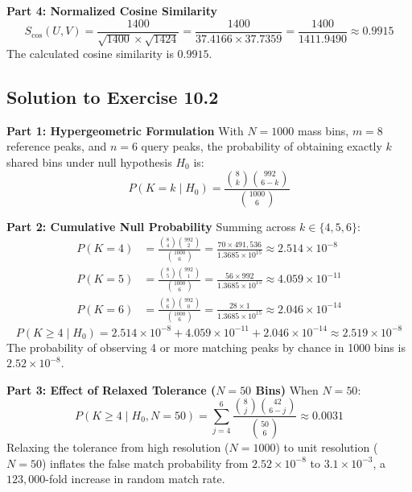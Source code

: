 \documentclass[11pt,twoside,openright]{book}
\begin{document}
\noindent\textbf{Part 4: Normalized Cosine Similarity}\enspace
\begin{equation*}
S_{\cos}(U, V) = \frac{1400}{\sqrt{1400} \times \sqrt{1424}} = \frac{1400}{37.4166 \times 37.7359} = \frac{1400}{1411.9490} \approx 0.9915
\end{equation*}
The calculated cosine similarity is $0.9915$.

\subsection{Solution to Exercise 10.2}

\noindent\textbf{Part 1: Hypergeometric Formulation}\enspace
With $N = 1000$ mass bins, $m = 8$ reference peaks, and $n = 6$ query peaks, the probability of obtaining exactly $k$ shared bins under null hypothesis $H_0$ is:
\begin{equation*}
P(K = k \mid H_0) = \frac{\binom{8}{k} \binom{992}{6 - k}}{\binom{1000}{6}}
\end{equation*}

\noindent\textbf{Part 2: Cumulative Null Probability}\enspace
Summing across $k \in \{4, 5, 6\}$:
\begin{align*}
P(K = 4) &= \frac{\binom{8}{4} \binom{992}{2}}{\binom{1000}{6}} = \frac{70 \times 491,536}{1.3685 \times 10^{15}} \approx 2.514 \times 10^{-8} \\
P(K = 5) &= \frac{\binom{8}{5} \binom{992}{1}}{\binom{1000}{6}} = \frac{56 \times 992}{1.3685 \times 10^{15}} \approx 4.059 \times 10^{-11} \\
P(K = 6) &= \frac{\binom{8}{6} \binom{992}{0}}{\binom{1000}{6}} = \frac{28 \times 1}{1.3685 \times 10^{15}} \approx 2.046 \times 10^{-14}
\end{align*}
\begin{equation*}
P(K \ge 4 \mid H_0) = 2.514 \times 10^{-8} + 4.059 \times 10^{-11} + 2.046 \times 10^{-14} \approx 2.519 \times 10^{-8}
\end{equation*}
The probability of observing 4 or more matching peaks by chance in 1000 bins is $2.52 \times 10^{-8}$.

\noindent\textbf{Part 3: Effect of Relaxed Tolerance ($N = 50$ Bins)}\enspace
When $N = 50$:
\begin{equation*}
P(K \ge 4 \mid H_0, N = 50) = \sum_{j=4}^6 \frac{\binom{8}{j} \binom{42}{6 - j}}{\binom{50}{6}} \approx 0.0031
\end{equation*}
Relaxing the tolerance from high resolution ($N = 1000$) to unit resolution ($N = 50$) inflates the false match probability from $2.52 \times 10^{-8}$ to $3.1 \times 10^{-3}$, a $123,000$-fold increase in random match rate.
\end{document}

